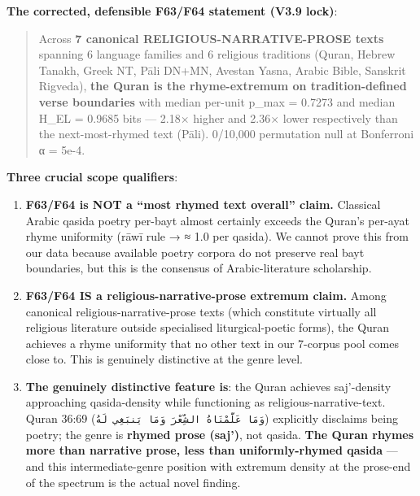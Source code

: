 \documentclass[
]{article}
\begin{document}
\textbf{The corrected, defensible F63/F64 statement (V3.9 lock)}:

\begin{quote}
Across \textbf{7 canonical RELIGIOUS-NARRATIVE-PROSE texts} spanning 6
language families and 6 religious traditions (Quran, Hebrew Tanakh,
Greek NT, Pāli DN+MN, Avestan Yasna, Arabic Bible, Sanskrit Rigveda),
\textbf{the Quran is the rhyme-extremum on tradition-defined verse
boundaries} with median per-unit p\_max = 0.7273 and median H\_EL =
0.9685 bits --- 2.18× higher and 2.36× lower respectively than the
next-most-rhymed text (Pāli). 0/10,000 permutation null at Bonferroni α
= 5e-4.
\end{quote}

\textbf{Three crucial scope qualifiers}:

\begin{enumerate}
\def\labelenumi{\arabic{enumi}.}
\item
  \textbf{F63/F64 is NOT a ``most rhymed text overall'' claim.}
  Classical Arabic qasida poetry per-bayt almost certainly exceeds the
  Quran's per-ayat rhyme uniformity (rāwī rule → ≈ 1.0 per qasida). We
  cannot prove this from our data because available poetry corpora do
  not preserve real bayt boundaries, but this is the consensus of
  Arabic-literature scholarship.
\item
  \textbf{F63/F64 IS a religious-narrative-prose extremum claim.} Among
  canonical religious-narrative-prose texts (which constitute virtually
  all religious literature outside specialised liturgical-poetic forms),
  the Quran achieves a rhyme uniformity that no other text in our
  7-corpus pool comes close to. This is genuinely distinctive at the
  genre level.
\item
  \textbf{The genuinely distinctive feature is}: the Quran achieves
  saj'-density approaching qasida-density while functioning as
  religious-narrative-text. Quran 36:69
  (\texttt{وَمَا\ عَلَّمْنَاهُ\ الشِّعْرَ\ وَمَا\ يَنبَغِي\ لَهُ}) explicitly disclaims
  being poetry; the genre is \textbf{rhymed prose (saj')}, not qasida.
  \textbf{The Quran rhymes more than narrative prose, less than
  uniformly-rhymed qasida} --- and this intermediate-genre position with
  extremum density at the prose-end of the spectrum is the actual novel
  finding.
\end{enumerate}
\end{document}
